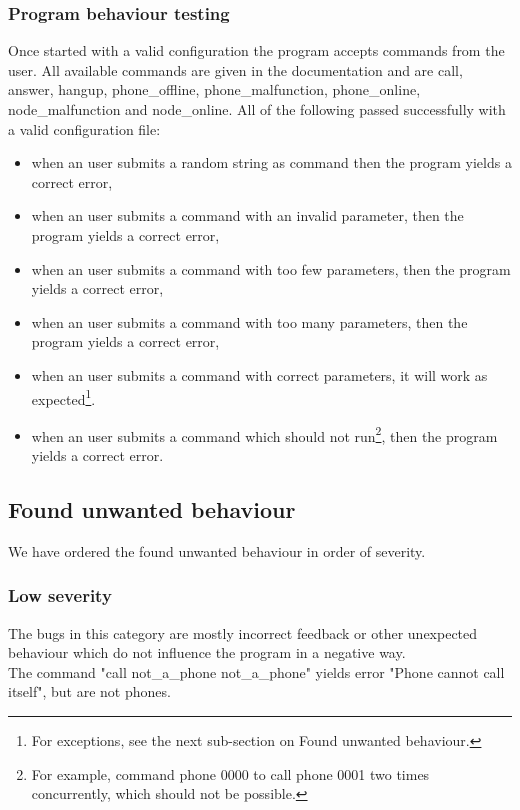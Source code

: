 \documentclass{article}
\begin{document}
\subsubsection{Program behaviour testing}
Once started with a valid configuration the program accepts commands from the user. All available commands are given in the documentation and are call, answer, hangup, phone\_offline, phone\_malfunction, phone\_online, node\_malfunction and node\_online. All of the following passed successfully with a valid configuration file:
\begin{itemize}
    \item when an user submits a random string as command then the program yields a correct error,
    \item when an user submits a command with an invalid parameter, then the program yields a correct error,
    \item when an user submits a command with too few parameters, then the program yields a correct error,
    \item when an user submits a command with too many parameters, then the program yields a correct error,
    \item when an user submits a command with correct parameters, it will work as expected\footnote{For exceptions, see the next sub-section on Found unwanted behaviour.}.
    \item when an user submits a command which should not run\footnote{For example, command phone 0000 to call phone 0001 two times concurrently, which should not be possible.}, then the program yields a correct error.
\end{itemize}

\subsection{Found unwanted behaviour}
We have ordered the found unwanted behaviour in order of severity.
\subsubsection{Low severity}
The bugs in this category are mostly incorrect feedback or other unexpected behaviour which do not influence the program in a negative way.
\\

The command "call not\_a\_phone not\_a\_phone" yields error "Phone cannot call itself", but are not phones.
\\
\end{document}
